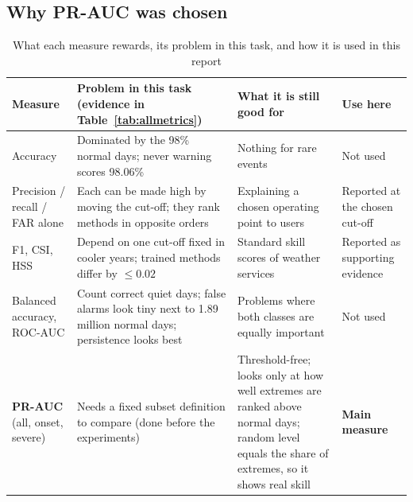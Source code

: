 \documentclass[12pt,a4paper]{report}
\begin{document}
\subsection{Why PR-AUC was chosen}
\begin{table}[H]
\centering
\caption{What each measure rewards, its problem in this task, and how it is used in this report}
\label{tab:metricchoice}
\footnotesize
\begin{tabularx}{\textwidth}{|>{\raggedright\arraybackslash}p{2.5cm}|>{\raggedright\arraybackslash}X|>{\raggedright\arraybackslash}p{4.4cm}|>{\raggedright\arraybackslash}p{2.3cm}|}
\hline
\textbf{Measure} & \textbf{Problem in this task (evidence in Table~\ref{tab:allmetrics})} & \textbf{What it is still good for} & \textbf{Use here}\\ \hline
Accuracy & Dominated by the 98\% normal days; never warning scores 98.06\% & Nothing for rare events & Not used\\ \hline
Precision / recall / FAR alone & Each can be made high by moving the cut-off; they rank methods in opposite orders & Explaining a chosen operating point to users & Reported at the chosen cut-off\\ \hline
F1, CSI, HSS & Depend on one cut-off fixed in cooler years; trained methods differ by $\le 0.02$ & Standard skill scores of weather services & Reported as supporting evidence\\ \hline
Balanced accuracy, ROC-AUC & Count correct quiet days; false alarms look tiny next to 1.89 million normal days; persistence looks best & Problems where both classes are equally important & Not used\\ \hline
\textbf{PR-AUC} (all, onset, severe) & Needs a fixed subset definition to compare (done before the experiments) & Threshold-free; looks only at how well extremes are ranked above normal days; random level equals the share of extremes, so it shows real skill & \textbf{Main measure}\\ \hline
\end{tabularx}
\end{table}
\end{document}
